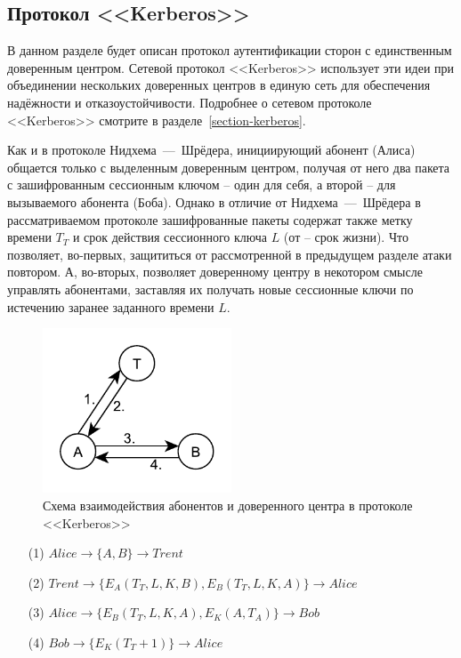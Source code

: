 \subsection{Протокол <<Kerberos>>}

В данном разделе будет описан протокол аутентификации сторон с единственным доверенным центром. Сетевой протокол <<Kerberos>> использует эти идеи при объединении нескольких доверенных центров в единую сеть для обеспечения надёжности и отказоустойчивости. Подробнее о сетевом протоколе <<Kerberos>> смотрите в разделе~\ref{section-kerberos}.

Как и в протоколе Нидхема~---~Шрёдера, инициирующий абонент (Алиса) общается только с выделенным доверенным центром, получая от него два пакета с зашифрованным сессионным ключом -- один для себя, а второй -- для вызываемого абонента (Боба). Однако в отличие от Нидхема~---~Шрёдера в рассматриваемом протоколе зашифрованные пакеты содержат также метку времени $T_T$ и срок действия сессионного ключа $L$ (от  -- срок жизни). Что позволяет, во-первых, защититься от рассмотренной в предыдущем разделе атаки повтором. А, во-вторых, позволяет доверенному центру в некотором смысле управлять абонентами, заставляя их получать новые сессионные ключи по истечению заранее заданного времени $L$.

\begin{figure}[!htb]
    \centering
    \includegraphics[width=0.5\textwidth]{pic/key_distribution-kerberos}
    \caption{Схема взаимодействия абонентов и доверенного центра в протоколе <<Kerberos>>\label{fig:key_distribution-kerberos}}
\end{figure}

\begin{samepage}\begin{enumerate}
	\item[(1)] $ Alice \to \{ A, B \} \to Trent $
	\item[(2)] $ Trent \to \{ E_A \left( T_T, L, K, B \right), E_B \left( T_T, L, K, A \right) \} \to Alice $
	\item[(3)] $ Alice \to \{ E_B \left( T_T, L, K, A \right), E_K \left( A, T_A \right) \} \to Bob $
	\item[(4)] $ Bob \to \{ E_K \left( T_T + 1 \right) \} \to Alice $
\end{enumerate}\end{samepage}

